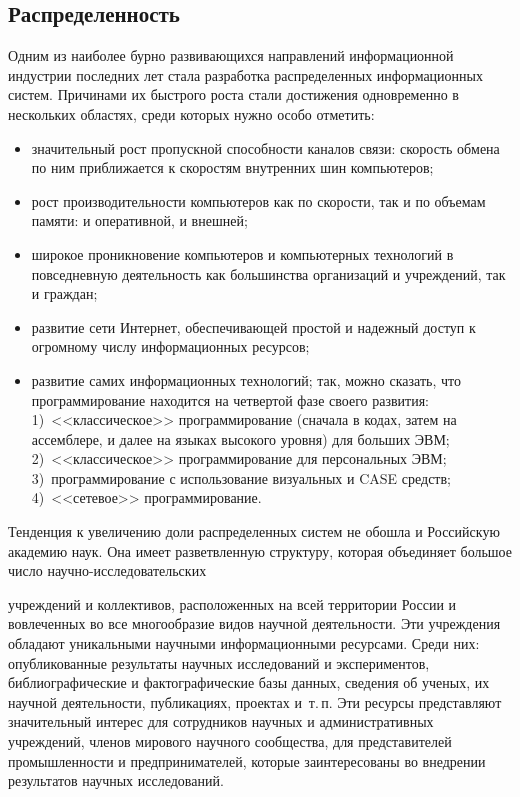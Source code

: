 \begin{multicols}{2}
\vspace*{-6pt}

\subsection{Распределенность}
  
  Одним из наиболее бурно развивающихся направлений информационной индустрии 
последних лет стала разработка распределенных информационных систем. Причинами их 
быстрого роста стали достижения одновременно в нескольких областях, среди которых 
нужно особо отметить:
  \begin{itemize}
\item значительный рост пропускной способности каналов связи: скорость обмена по ним 
приближается к скоростям внутренних шин компьютеров;\\[-14pt]
\item рост производительности компьютеров как по скорости, так и по объемам памяти: и 
оперативной, и внешней;\\[-14pt]
\item широкое проникновение компьютеров и компьютерных технологий в повседневную 
дея\-тель\-ность как большинства организаций и учреждений, так и граждан;\\[-14pt]
\item развитие сети Интернет, обеспечивающей прос\-той и надежный доступ к огромному 
числу информационных ресурсов;\\[-14pt]
\item развитие самих информационных технологий; так, можно сказать, что 
программирование находится на четвертой фазе своего развития: 1)~<<классическое>> 
программирование (сначала в кодах, затем на ассемблере, и далее на языках высокого уровня) 
для больших ЭВМ; 2)~<<классическое>> программирование для персональных ЭВМ; 
3)~программирование с использование визуальных и CASE средств; 4)~<<сетевое>> 
программирование.
\end{itemize}

  Тенденция к увеличению доли распределенных систем не обошла и Российскую академию 
наук.
 Она имеет разветвленную структуру, которая объединяет большое число научно-ис\-сле\-до\-ва\-тель\-ских\linebreak\vspace*{-12pt}
\pagebreak

\noindent
учреждений и коллективов, расположенных на всей территории России и 
вовлеченных во все многообразие видов научной деятельности. Эти учреждения обладают 
уникальными научными информационными ресурсами. Среди них: опубликованные 
результаты научных исследований и экспериментов, библиографические и 
фактографические базы данных, сведения об ученых, их научной деятельности, 
публикациях, проектах и~т.\,п. Эти ресурсы представляют значительный интерес для 
сотрудников научных и административных учреждений, членов мирового научного 
сообщества, для представителей промышленности и предпринимателей, которые 
заинтересованы во внедрении результатов научных исследований.
  

\end{multicols}
